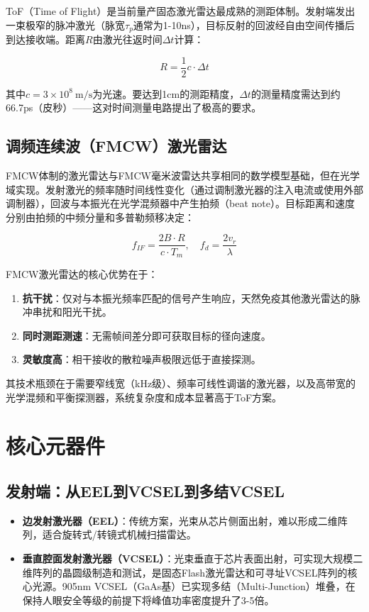 \documentclass[12pt,a4paper,openany,UTF8]{ctexbook}
\begin{document}
ToF（Time of Flight）是当前量产固态激光雷达最成熟的测距体制。发射端发出一束极窄的脉冲激光（脉宽$\tau_p$通常为1-10ns），目标反射的回波经自由空间传播后到达接收端。距离$R$由激光往返时间$\Delta t$计算：

\begin{equation}\label{eq:lidar_tof}
R = \frac{1}{2} c \cdot \Delta t
\end{equation}

其中$c = 3 \times 10^8\ \text{m/s}$为光速。要达到1cm的测距精度，$\Delta t$的测量精度需达到约66.7ps（皮秒）——这对时间测量电路提出了极高的要求。

\subsection{调频连续波（FMCW）激光雷达}

FMCW体制的激光雷达与FMCW毫米波雷达共享相同的数学模型基础，但在光学域实现。发射激光的频率随时间线性变化（通过调制激光器的注入电流或使用外部调制器），回波与本振光在光学混频器中产生拍频（beat note）。目标距离和速度分别由拍频的中频分量和多普勒频移决定：

\begin{equation}\label{eq:lidar_fmcw_r}
f_{IF} = \frac{2B \cdot R}{c \cdot T_m},\quad f_d = \frac{2v_r}{\lambda}
\end{equation}

FMCW激光雷达的核心优势在于：
\begin{enumerate}
    \item \textbf{抗干扰}：仅对与本振光频率匹配的信号产生响应，天然免疫其他激光雷达的脉冲串扰和阳光干扰。
    \item \textbf{同时测距测速}：无需帧间差分即可获取目标的径向速度。
    \item \textbf{灵敏度高}：相干接收的散粒噪声极限远低于直接探测。
\end{enumerate}

其技术瓶颈在于需要窄线宽（kHz级）、频率可线性调谐的激光器，以及高带宽的光学混频和平衡探测器，系统复杂度和成本显著高于ToF方案。

\section{核心元器件}

\subsection{发射端：从EEL到VCSEL到多结VCSEL}

\begin{itemize}
    \item \textbf{边发射激光器（EEL）}：传统方案，光束从芯片侧面出射，难以形成二维阵列，适合旋转式/转镜式机械扫描雷达。
    \item \textbf{垂直腔面发射激光器（VCSEL）}：光束垂直于芯片表面出射，可实现大规模二维阵列的晶圆级制造和测试，是固态Flash激光雷达和可寻址VCSEL阵列的核心光源。905nm VCSEL（GaAs基）已实现多结（Multi-Junction）堆叠，在保持人眼安全等级的前提下将峰值功率密度提升了3-5倍。
\end{itemize}
\end{document}
